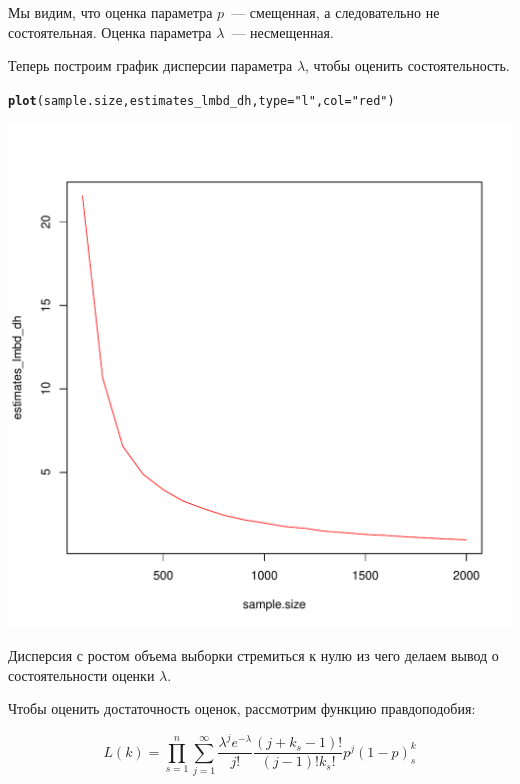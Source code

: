 \documentclass{article}\usepackage[]{graphicx}\usepackage[]{color}
\makeatletter
\def\maxwidth{ %
  \ifdim\Gin@nat@width>\linewidth
    \linewidth
  \else
    \Gin@nat@width
  \fi
}
\newcommand{\hlstr}[1]{\textcolor[rgb]{0.192,0.494,0.8}{#1}}%
\newcommand{\hlstd}[1]{\textcolor[rgb]{0.345,0.345,0.345}{#1}}%
\newcommand{\hlkwc}[1]{\textcolor[rgb]{0.333,0.667,0.333}{#1}}%
\newcommand{\hlkwd}[1]{\textcolor[rgb]{0.737,0.353,0.396}{\textbf{#1}}}%
\newenvironment{kframe}{%
 \def\at@end@of@kframe{}%
 \ifinner\ifhmode%
  \def\at@end@of@kframe{\end{minipage}}%
  \begin{minipage}{\columnwidth}%
 \fi\fi%
 \def\FrameCommand##1{\hskip\@totalleftmargin \hskip-\fboxsep
 \colorbox{shadecolor}{##1}\hskip-\fboxsep
     \hskip-\linewidth \hskip-\@totalleftmargin \hskip\columnwidth}%
 \MakeFramed {\advance\hsize-\width
   \@totalleftmargin\z@ \linewidth\hsize
   \@setminipage}}%
 {\par\unskip\endMakeFramed%
 \at@end@of@kframe}
\newenvironment{knitrout}{}{} %
\makeatother
\begin{document}
\begin{knitrout}
\end{knitrout}

Мы видим, что оценка параметра $p$~--- смещенная, а следовательно не состоятельная.
Оценка параметра $\lambda$~--- несмещенная.

Теперь построим график дисперсии параметра $\lambda$, чтобы оценить состоятельность.

\begin{knitrout}
\color{fgcolor}\begin{kframe}
\begin{alltt}
\hlkwd{plot}\hlstd{(sample.size, estimates_lmbd_dh,} \hlkwc{type} \hlstd{=} \hlstr{"l"}\hlstd{,} \hlkwc{col} \hlstd{=} \hlstr{"red"}\hlstd{)}
\end{alltt}
\end{kframe}
\includegraphics[width=\maxwidth]{figure/unnamed-chunk-10-1} 

\end{knitrout}

Дисперсия с ростом объема выборки стремиться к нулю из чего делаем вывод о состоятельности оценки $\lambda$.

Чтобы оценить достаточность оценок, рассмотрим функцию правдоподобия:

\[
L(k) = \prod_{s=1}^n \sum_{j=1}^{\infty} \frac{\lambda^j e^{-\lambda}}{j!} \frac{(j + k_s - 1)!}{(j - 1)! k_s!} p^j (1 - p)^k_s
\]
\end{document}
